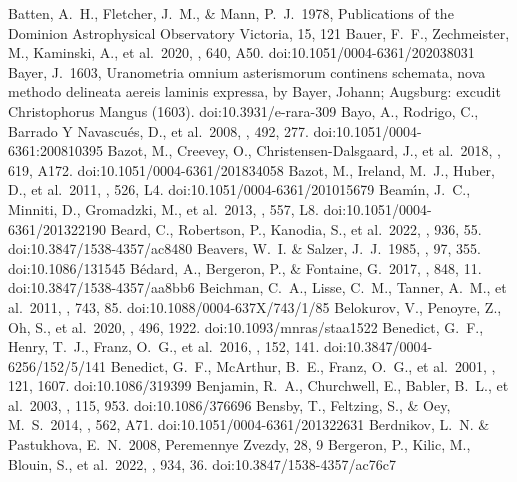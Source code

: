 \documentclass[twocolumn,tighten,twocolappendix]{aastex631}
\begin{document}
\begin{thebibliography}{}
 Batten, A.~H., Fletcher, J.~M., \& Mann, P.~J.\ 1978, Publications of the Dominion Astrophysical Observatory Victoria, 15, 121
 Bauer, F.~F., Zechmeister, M., Kaminski, A., et al.\ 2020, \aap, 640, A50. doi:10.1051/0004-6361/202038031
 Bayer, J.\ 1603, Uranometria omnium asterismorum continens schemata, nova methodo delineata aereis laminis expressa, by Bayer, Johann; Augsburg: excudit Christophorus Mangus (1603). doi:10.3931/e-rara-309
 Bayo, A., Rodrigo, C., Barrado Y Navascu{\'e}s, D., et al.\ 2008, \aap, 492, 277. doi:10.1051/0004-6361:200810395
 Bazot, M., Creevey, O., Christensen-Dalsgaard, J., et al.\ 2018, \aap, 619, A172. doi:10.1051/0004-6361/201834058
 Bazot, M., Ireland, M.~J., Huber, D., et al.\ 2011, \aap, 526, L4. doi:10.1051/0004-6361/201015679
 Beam{\'\i}n, J.~C., Minniti, D., Gromadzki, M., et al.\ 2013, \aap, 557, L8. doi:10.1051/0004-6361/201322190
 Beard, C., Robertson, P., Kanodia, S., et al.\ 2022, \apj, 936, 55. doi:10.3847/1538-4357/ac8480
 Beavers, W.~I. \& Salzer, J.~J.\ 1985, \pasp, 97, 355. doi:10.1086/131545
 B{\'e}dard, A., Bergeron, P., \& Fontaine, G.\ 2017, \apj, 848, 11. doi:10.3847/1538-4357/aa8bb6
 Beichman, C.~A., Lisse, C.~M., Tanner, A.~M., et al.\ 2011, \apj, 743, 85. doi:10.1088/0004-637X/743/1/85
 Belokurov, V., Penoyre, Z., Oh, S., et al.\ 2020, \mnras, 496, 1922. doi:10.1093/mnras/staa1522
 Benedict, G.~F., Henry, T.~J., Franz, O.~G., et al.\ 2016, \aj, 152, 141. doi:10.3847/0004-6256/152/5/141
 Benedict, G.~F., McArthur, B.~E., Franz, O.~G., et al.\ 2001, \aj, 121, 1607. doi:10.1086/319399
 Benjamin, R.~A., Churchwell, E., Babler, B.~L., et al.\ 2003, \pasp, 115, 953. doi:10.1086/376696
 Bensby, T., Feltzing, S., \& Oey, M.~S.\ 2014, \aap, 562, A71. doi:10.1051/0004-6361/201322631
 Berdnikov, L.~N. \& Pastukhova, E.~N.\ 2008, Peremennye Zvezdy, 28, 9
 Bergeron, P., Kilic, M., Blouin, S., et al.\ 2022, \apj, 934, 36. doi:10.3847/1538-4357/ac76c7

\end{thebibliography}
\end{document}
